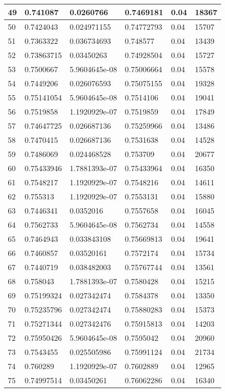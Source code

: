 \begin{longtable}{|l|l|l|l|l|l|}
49 & 0.741087 & 0.0260766 & 0.7469181 & 0.04 & 18367 \\ \hline 
50 & 0.7424043 & 0.024971155 & 0.74772793 & 0.04 & 15707 \\ \hline 
51 & 0.7363322 & 0.036734693 & 0.748577 & 0.04 & 13439 \\ \hline 
52 & 0.73863715 & 0.03450263 & 0.74928504 & 0.04 & 15727 \\ \hline 
53 & 0.7500667 & 5.9604645e-08 & 0.75006664 & 0.04 & 15578 \\ \hline 
54 & 0.7449206 & 0.026076593 & 0.75075155 & 0.04 & 19328 \\ \hline 
55 & 0.75141054 & 5.9604645e-08 & 0.7514106 & 0.04 & 19041 \\ \hline 
56 & 0.7519858 & 1.1920929e-07 & 0.7519859 & 0.04 & 17849 \\ \hline 
57 & 0.74647725 & 0.026687136 & 0.75259966 & 0.04 & 13486 \\ \hline 
58 & 0.7470415 & 0.026687136 & 0.7531638 & 0.04 & 14528 \\ \hline 
59 & 0.7486069 & 0.024468528 & 0.753709 & 0.04 & 20677 \\ \hline 
60 & 0.75433946 & 1.7881393e-07 & 0.75433964 & 0.04 & 16350 \\ \hline 
61 & 0.7548217 & 1.1920929e-07 & 0.7548216 & 0.04 & 14611 \\ \hline 
62 & 0.755313 & 1.1920929e-07 & 0.7553131 & 0.04 & 15880 \\ \hline 
63 & 0.7446341 & 0.0352016 & 0.7557658 & 0.04 & 16045 \\ \hline 
64 & 0.7562733 & 5.9604645e-08 & 0.7562734 & 0.04 & 14558 \\ \hline 
65 & 0.7464943 & 0.033843108 & 0.75669813 & 0.04 & 19641 \\ \hline 
66 & 0.7460857 & 0.03520161 & 0.7572174 & 0.04 & 15734 \\ \hline 
67 & 0.7440719 & 0.038482003 & 0.75767744 & 0.04 & 13561 \\ \hline 
68 & 0.758043 & 1.7881393e-07 & 0.7580428 & 0.04 & 15215 \\ \hline 
69 & 0.75199324 & 0.027342474 & 0.7584378 & 0.04 & 13350 \\ \hline 
70 & 0.75235796 & 0.027342474 & 0.75880283 & 0.04 & 15373 \\ \hline 
71 & 0.75271344 & 0.027342476 & 0.75915813 & 0.04 & 14203 \\ \hline 
72 & 0.75950426 & 5.9604645e-08 & 0.7595042 & 0.04 & 20960 \\ \hline 
73 & 0.7543455 & 0.025505986 & 0.75991124 & 0.04 & 21734 \\ \hline 
74 & 0.760289 & 1.1920929e-07 & 0.7602889 & 0.04 & 12965 \\ \hline 
75 & 0.74997514 & 0.03450261 & 0.76062286 & 0.04 & 16340 \\ \hline 
\end{longtable}